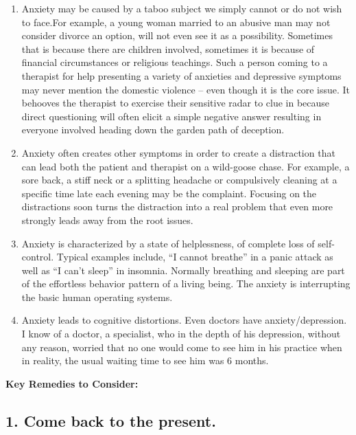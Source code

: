 \documentclass[]{book}
\begin{document}
\begin{enumerate}
\def\labelenumi{\arabic{enumi}.}
\item
  Anxiety may be caused by a taboo subject we simply cannot or do not wish to face.For example, a young woman married to an abusive man may not consider divorce an option, will not even see it as a possibility. Sometimes that is because there are children involved, sometimes it is because of financial circumstances or religious teachings. Such a person coming to a therapist for help presenting a variety of anxieties and depressive symptoms may never mention the domestic violence -- even though it is the core issue. It behooves the therapist to exercise their sensitive radar to clue in because direct questioning will often elicit a simple negative answer resulting in everyone involved heading down the garden path of deception.
\item
  Anxiety often creates other symptoms in order to create a distraction that can lead both the patient and therapist on a wild-goose chase. For example, a sore back, a stiff neck or a splitting headache or compulsively cleaning at a specific time late each evening may be the complaint. Focusing on the distractions soon turns the distraction into a real problem that even more strongly leads away from the root issues.
\item
  Anxiety is characterized by a state of helplessness, of complete loss of self-control. Typical examples include, ``I cannot breathe'' in a panic attack as well as ``I can't sleep'' in insomnia. Normally breathing and sleeping are part of the effortless behavior pattern of a living being. The anxiety is interrupting the basic human operating systems.
\item
  Anxiety leads to cognitive distortions. Even doctors have anxiety/depression. I know of a doctor, a specialist, who in the depth of his depression, without any reason, worried that no one would come to see him in his practice when in reality, the usual waiting time to see him was 6 months.
\end{enumerate}

\textbf{Key Remedies to Consider:}

\hypertarget{come-back-to-the-present.}{%
\subsection*{1. Come back to the present.}\label{come-back-to-the-present.}}
\end{document}
